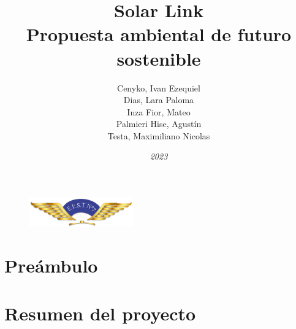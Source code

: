 \documentclass{ol-softwaremanual}
\begin{document}
\begin{figure}[b]
\centering
\includegraphics[width=0.4\textwidth]{Main/logo-impa.png}
\end{figure}


\title{Solar Link \\ Propuesta ambiental de futuro sostenible}
\author{Cenyko, Ivan Ezequiel \\ Dias, Lara Paloma \\ Inza Fior, Mateo \\ Palmieri Hise, Agustín \\ Testa, Maximiliano Nicolas}
\date{\textit{2023}}

\maketitle
\tableofcontents
\newpage

\section{Preámbulo}



\clearpage

\section{Resumen del proyecto}
\end{document}
